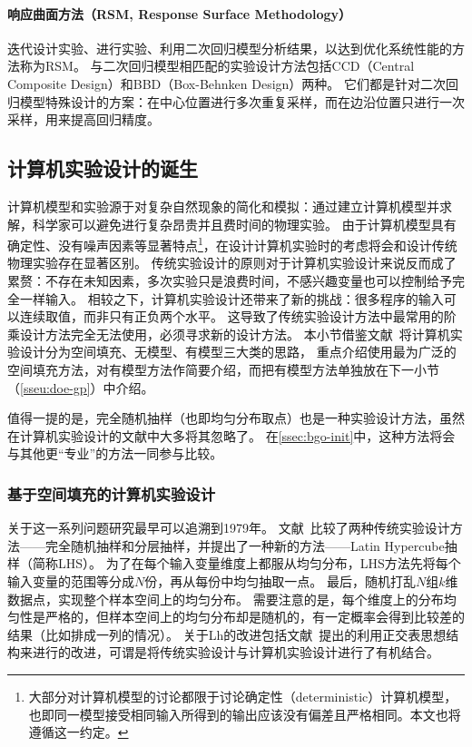 \documentclass[index]{subfiles}
\begin{document}
\paragraph{响应曲面方法（RSM, Response Surface Methodology）}
迭代设计实验、进行实验、利用二次回归模型分析结果，以达到优化系统性能的方法称为RSM。
与二次回归模型相匹配的实验设计方法包括CCD（Central Composite Design）和BBD（Box-Behnken Design）两种。
它们都是针对二次回归模型特殊设计的方案：在中心位置进行多次重复采样，而在边沿位置只进行一次采样，用来提高回归精度\cite{montgomery}。

\subsection{计算机实验设计的诞生}
计算机模型和实验源于对复杂自然现象的简化和模拟：通过建立计算机模型并求解，科学家可以避免进行复杂昂贵并且费时间的物理实验。
由于计算机模型具有确定性、没有噪声因素等显著特点\footnote{大部分对计算机模型的讨论都限于讨论确定性（deterministic）计算机模型，也即同一模型接受相同输入所得到的输出应该没有偏差且严格相同。本文也将遵循这一约定。}，在设计计算机实验时的考虑将会和设计传统物理实验存在显著区别\cite{sacks1989}。
传统实验设计的原则对于计算机实验设计来说反而成了累赘：不存在未知因素，多次实验只是浪费时间，不感兴趣变量也可以控制给予完全一样输入。
相较之下，计算机实验设计还带来了新的挑战：很多程序的输入可以连续取值，而非只有正负两个水平。
这导致了传统实验设计方法中最常用的阶乘设计方法完全无法使用，必须寻求新的设计方法。
本小节借鉴文献~将计算机实验设计分为空间填充、无模型、有模型三大类的思路，
重点介绍使用最为广泛的空间填充方法，对有模型方法作简要介绍，而把有模型方法单独放在下一小节（\cref{sseu:doe-gp}）中介绍。

值得一提的是，完全随机抽样（也即均匀分布取点）也是一种实验设计方法，虽然在计算机实验设计的文献中大多将其忽略了。
在\cref{ssec:bgo-init}中，这种方法将会与其他更“专业”的方法一同参与比较。

\subsubsection{基于空间填充的计算机实验设计}
关于这一系列问题研究最早可以追溯到1979年。
文献~比较了两种传统实验设计方法——完全随机抽样和分层抽样，并提出了一种新的方法——Latin Hypercube抽样（简称LHS）。
为了在每个输入变量维度上都服从均匀分布，LHS方法先将每个输入变量的范围等分成$N$份，再从每份中均匀抽取一点。
最后，随机打乱$N$组$k$维数据点，实现整个样本空间上的均匀分布。
需要注意的是，每个维度上的分布均匀性是严格的，但样本空间上的均匀分布却是随机的，有一定概率会得到比较差的结果（比如排成一列的情况\cite{pronzato2012}）。
关于Lh的改进包括文献~提出的利用正交表思想结构来进行的改进，可谓是将传统实验设计与计算机实验设计进行了有机结合。
\end{document}
